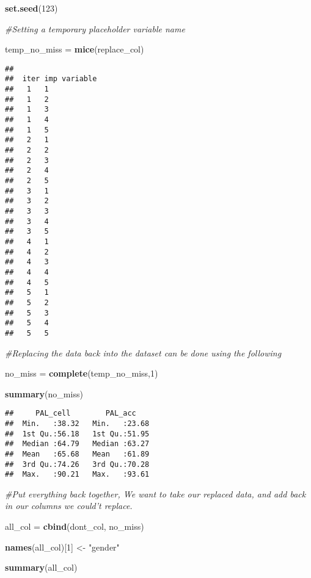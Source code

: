 \documentclass[
]{article}
\newenvironment{Shaded}{\begin{snugshade}}{\end{snugshade}}
\newcommand{\CommentTok}[1]{\textcolor[rgb]{0.56,0.35,0.01}{\textit{#1}}}
\newcommand{\DecValTok}[1]{\textcolor[rgb]{0.00,0.00,0.81}{#1}}
\newcommand{\KeywordTok}[1]{\textcolor[rgb]{0.13,0.29,0.53}{\textbf{#1}}}
\newcommand{\NormalTok}[1]{#1}
\newcommand{\StringTok}[1]{\textcolor[rgb]{0.31,0.60,0.02}{#1}}
\begin{document}
\begin{Shaded}
\begin{Highlighting}[]
\KeywordTok{set.seed}\NormalTok{(}\DecValTok{123}\NormalTok{)}

\CommentTok{#Setting a temporary placeholder variable name}

\NormalTok{temp_no_miss =}\StringTok{ }\KeywordTok{mice}\NormalTok{(replace_col)}
\end{Highlighting}
\end{Shaded}

\begin{verbatim}
## 
##  iter imp variable
##   1   1
##   1   2
##   1   3
##   1   4
##   1   5
##   2   1
##   2   2
##   2   3
##   2   4
##   2   5
##   3   1
##   3   2
##   3   3
##   3   4
##   3   5
##   4   1
##   4   2
##   4   3
##   4   4
##   4   5
##   5   1
##   5   2
##   5   3
##   5   4
##   5   5
\end{verbatim}

\begin{Shaded}
\begin{Highlighting}[]
\CommentTok{#Replacing the data back into the dataset can be done using the following}

\NormalTok{no_miss =}\StringTok{ }\KeywordTok{complete}\NormalTok{(temp_no_miss,}\DecValTok{1}\NormalTok{)}

\KeywordTok{summary}\NormalTok{(no_miss)}
\end{Highlighting}
\end{Shaded}

\begin{verbatim}
##     PAL_cell        PAL_acc     
##  Min.   :38.32   Min.   :23.68  
##  1st Qu.:56.18   1st Qu.:51.95  
##  Median :64.79   Median :63.27  
##  Mean   :65.68   Mean   :61.89  
##  3rd Qu.:74.26   3rd Qu.:70.28  
##  Max.   :90.21   Max.   :93.61
\end{verbatim}

\begin{Shaded}
\begin{Highlighting}[]
\CommentTok{#Put everything back together, We want to take our replaced data, and add back in our columns we could’t replace.}

\NormalTok{all_col =}\StringTok{ }\KeywordTok{cbind}\NormalTok{(dont_col, no_miss)}

\KeywordTok{names}\NormalTok{(all_col)[}\DecValTok{1}\NormalTok{] <-}\StringTok{ "gender"}

\KeywordTok{summary}\NormalTok{(all_col)}
\end{Highlighting}
\end{Shaded}
\end{document}
